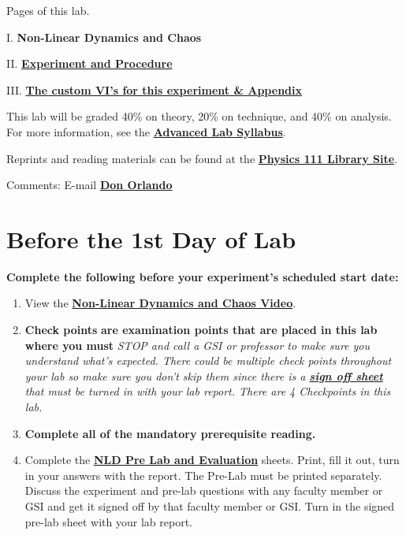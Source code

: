 \documentclass{../lab}
\begin{document}
Pages of this lab.

I. \textbf{Non-Linear Dynamics and Chaos}

II. \href{http://experimentationlab.berkeley.edu/node/102}{\textbf{Experiment and Procedure}}

III. \href{http://experimentationlab.berkeley.edu/node/103}{\textbf{The custom VI's for this experiment \& Appendix}}

This lab will be graded 40\% on theory, 20\% on technique, and 40\% on analysis. For more information, see the \href{\AdvancedLabSyllabus}{\textbf{Advanced Lab Syllabus}}.

Reprints and reading materials can be found at the \href{http://physics111.lib.berkeley.edu/Physics111/Reprints/NLD/NLD\_index.html}{\textbf{Physics 111 Library Site}}.

Comments: E-mail \href{\MailDonOrlando}{\textbf{Don Orlando}}

\section{Before the 1st Day of Lab}

\textbf{Complete the following before your experiment's scheduled start date:}

\begin{enumerate}
    \item View the \href{http://www.youtube.com/watch?v=Y0u3o9\_BRVQ}{\textbf{Non-Linear Dynamics and Chaos Video}}.

    \item \textbf{Check points} \textbf{are examination points that are placed in this lab where you must }\emph{STOP and call a GSI or professor to make sure you understand what's expected. There could  be multiple check points throughout your lab so make sure you don't skip them since there is a \href{http://experimentationlab.berkeley.edunldcheckpoints}{\textbf{sign off sheet}} that must be turned in with your lab report. There are 4 Checkpoints in this lab.}

    \item \textbf{Complete all of the mandatory prerequisite reading.}

    \item Complete the \href{http://experimentationlab.berkeley.edu/NLDPreLab}{\textbf{NLD Pre Lab and Evaluation}} sheets. Print, fill it out, turn in your answers with the report. The Pre-Lab must be printed separately. Discuss the experiment and pre-lab questions with any faculty member or GSI and get it signed off by that faculty member or GSI. Turn in the signed pre-lab sheet with your lab report.

\end{enumerate}
\end{document}
